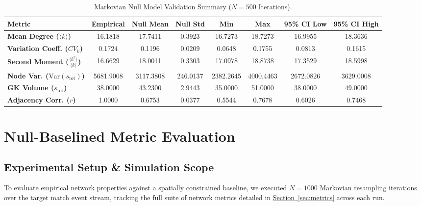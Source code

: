 \documentclass[12pt, a4paper]{article}
\begin{document}
\begin{table}[htbp]
    \centering
    \scriptsize
    \setlength{\tabcolsep}{3pt} %
    \caption{Markovian Null Model Validation Summary ($N=500$ Iterations).}
    \label{tab:null_validation_summary}
    \begin{tabularx}{\textwidth}{X c c c c c c c}
        \toprule
        \textbf{Metric} & \textbf{Empirical} & \textbf{Null Mean} & \textbf{Null Std} & \textbf{Min} & \textbf{Max} & \textbf{95\% CI Low} & \textbf{95\% CI High} \\
        \midrule
        \textbf{Mean Degree ($\langle k \rangle$)} & 16.1818 & 17.7411 & 0.3923 & 16.7273 & 18.7273 & 16.9955 & 18.3636 \\
        \addlinespace[3pt]
        \textbf{Variation Coeff. ($CV_k$)} & 0.1724 & 0.1196 & 0.0209 & 0.0648 & 0.1755 & 0.0813 & 0.1615 \\
        \addlinespace[3pt]
        \textbf{Second Moment ($\frac{\langle k^2 \rangle}{\langle k \rangle}$)} & 16.6629 & 18.0011 & 0.3303 & 17.0978 & 18.8738 & 17.3529 & 18.5998 \\
        \addlinespace[3pt]
        \textbf{Node Var. ($\text{Var}(s_{\text{tot}})$)} & 5681.9008 & 3117.3808 & 246.0137 & 2382.2645 & 4000.4463 & 2672.0826 & 3629.0008 \\
        \addlinespace[3pt]
        \textbf{GK Volume ($s_{\text{tot}}$)} & 38.0000 & 43.2300 & 2.9443 & 35.0000 & 51.0000 & 38.0000 & 49.0000 \\
        \addlinespace[3pt]
        \textbf{Adjacency Corr. ($r$)} & 1.0000 & 0.6753 & 0.0377 & 0.5544 & 0.7678 & 0.6026 & 0.7468 \\
        \bottomrule
    \end{tabularx}
\end{table}

\clearpage
\section{Null-Baselined Metric Evaluation}
\label{sec:null_baselined_evaluation}

\subsection{Experimental Setup \& Simulation Scope}
\label{subsec:experimental_setup}

To evaluate empirical network properties against a spatially constrained baseline, we executed $N = 1000$ Markovian resampling iterations over the target match event stream, tracking the full suite of network metrics detailed in \hyperref[sec:metrics]{Section~\ref{sec:metrics}} across each run.
\end{document}
